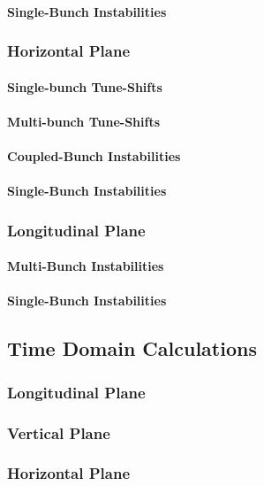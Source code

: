 \paragraph{Single-Bunch Instabilities}
\subsubsection{Horizontal Plane}
\paragraph{Single-bunch Tune-Shifts}
\paragraph{Multi-bunch Tune-Shifts}
\paragraph{Coupled-Bunch Instabilities}
\paragraph{Single-Bunch Instabilities}
\subsubsection{Longitudinal Plane}
\paragraph{Multi-Bunch Instabilities}
\paragraph{Single-Bunch Instabilities}
\subsection{Time Domain Calculations}
\subsubsection{Longitudinal Plane}
\subsubsection{Vertical Plane}
\subsubsection{Horizontal Plane}


%

